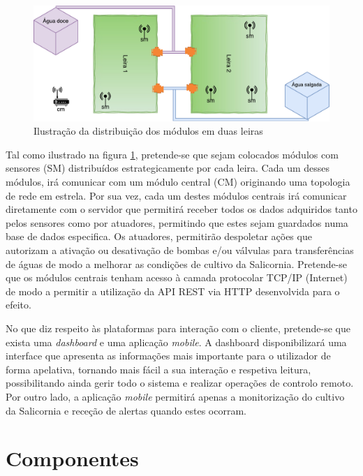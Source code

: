 \begin{figure}[!htb]
	\centering
	\includegraphics[scale=0.63]{esquemas/leiras-comm-geral.pdf}
	\caption{Ilustração da distribuição dos módulos em duas leiras}
	\label{leira}
\end{figure}


Tal como ilustrado na figura \ref{leira}, pretende-se que sejam colocados módulos com sensores (\acl{SM}) distribuídos estrategicamente por cada leira. Cada um desses módulos, irá comunicar com um módulo central (\acl{CM}) originando uma topologia de rede em estrela.  Por sua vez, cada um destes módulos centrais irá comunicar diretamente com o servidor que permitirá receber todos os dados adquiridos tanto pelos sensores como por atuadores, permitindo que estes sejam guardados numa base de dados especifica. Os atuadores, permitirão despoletar ações que autorizam a ativação ou desativação de bombas e/ou válvulas para transferências de águas de modo a melhorar as condições de cultivo da Salicornia. 
Pretende-se que os módulos centrais tenham acesso à camada protocolar \acs{TCP}/\acs{IP} (Internet) de modo a permitir a utilização da \acs{API} \acs{REST} via \ac{HTTP} desenvolvida para o efeito. 

No que diz respeito às plataformas para interação com o cliente, pretende-se que exista uma \textit{dashboard} e uma aplicação \textit{mobile}. A dashboard disponibilizará  uma interface que apresenta as informações mais importante para o utilizador de forma apelativa, tornando mais fácil a sua interação e respetiva leitura, possibilitando ainda gerir todo o sistema e realizar operações de controlo remoto. Por outro lado, a aplicação \textit{mobile} permitirá apenas a monitorização do cultivo da Salicornia e receção de alertas quando estes ocorram.




\section{Componentes}

